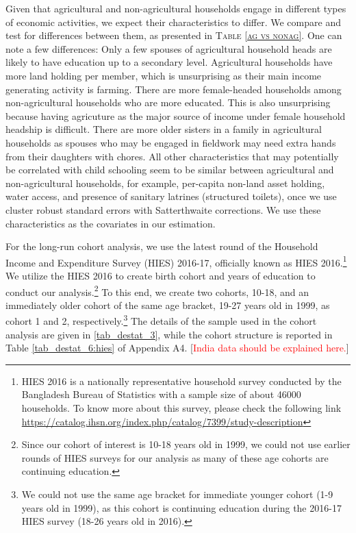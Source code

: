 \documentclass[12pt,letterpaper]{article}
\newcommand{\SAdded}[1]{\textcolor{red}{#1}}
\newcommand{\0}{\ensuremath{\mbox{\boldmath $0$}}}
\begin{document}
Given that agricultural and non-agricultural households engage in different types of economic activities, we expect their characteristics to differ. We compare and test for differences between them, as presented in \textsc{\small Table \ref{ag vs nonag}}. One can note a few differences: Only a few spouses of agricultural household heads are likely to have education up to a secondary level. Agricultural households have more land holding per member, which is unsurprising as their main income generating activity is farming. There are more female-headed households among non-agricultural households who are more educated. This is also unsurprising because having agricuture as the major source of income under female household headship is difficult. There are more older sisters in a family in agricultural households as spouses who may be engaged in fieldwork may need extra hands from their daughters with chores. All other characteristics that may potentially be correlated with child schooling seem to be similar between agricultural and non-agricultural households, for example, per-capita non-land asset holding, water access, and presence of sanitary latrines (structured toilets), once we use cluster robust standard errors with Satterthwaite corrections. We use these characteristics as the covariates in our estimation. 

For the long-run cohort analysis, we use the latest round of the Household Income and Expenditure Survey (HIES) 2016-17, officially known as HIES 2016.\footnote{HIES 2016 is a nationally representative household survey conducted by the Bangladesh Bureau of Statistics with a sample size of about 46000 households. To know more about this survey, please check the following link \url{https://catalog.ihsn.org/index.php/catalog/7399/study-description}} We utilize the HIES 2016 to create birth cohort and years of education to conduct our analysis.\footnote{Since our cohort of interest is 10-18 years old in 1999, we could not use earlier rounds of HIES surveys for our analysis as many of these age cohorts are continuing education.} To this end, we create two cohorts, 10-18, and an immediately older cohort of the same age bracket, 19-27 years old in 1999, as cohort 1 and 2, respectively.\footnote{We could not use the same age bracket for immediate younger cohort (1-9 years old in 1999), as this cohort is continuing education during the 2016-17 HIES survey (18-26 years old in 2016).} The details of the sample used in the cohort analysis are given in \ref{tab_destat_3}, while the cohort structure is reported in Table \ref{tab_destat_6:hies} of Appendix A4.  [\SAdded{India data should be explained here.}]
\end{document}

